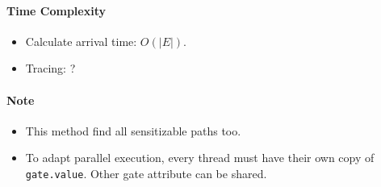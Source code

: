 \documentclass[]{article}
\let\oldparagraph\paragraph
\renewcommand{\paragraph}[1]{\oldparagraph{#1}\mbox{}}
\begin{document}
\paragraph{Time Complexity}\label{time-complexity-5}

\begin{itemize}
\item
  Calculate arrival time: \(O(|E|)\).
\item
  Tracing: ?
\end{itemize}

\paragraph{Note}\label{note-1}

\begin{itemize}
\item
  This method find all sensitizable paths too.
\item
  To adapt parallel execution, every thread must have their own copy of
  \texttt{gate.value}. Other gate attribute can be shared.
\end{itemize}
\end{document}
